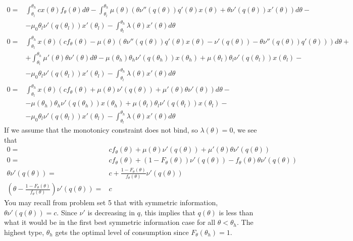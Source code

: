 \documentclass[12pt,reqno]{amsart}
\theoremstyle{definition}
\begin{document}
\begin{align*}
  0 = & \int_{\theta_l}^{\theta_h} c x(\theta) f_\theta(\theta)
  d\theta - \int_{\theta_l}^{\theta_h} \mu(\theta)
  \left( \theta \nu''(q(\theta))q'(\theta) x(\theta) + \theta
    \nu'(q(\theta)) x'(\theta) \right)d\theta - \\
  & - \mu_0 \theta_l
  \nu'(q(\theta_l))x'(\theta_l) - \int_{\theta_l}^{\theta_h}
  \lambda(\theta) x'(\theta) d\theta \\
  0 = & \int_{\theta_l}^{\theta_h} x(\theta)\left( c f_\theta(\theta)
    - \mu(\theta) \left( \theta \nu''(q(\theta))q'(\theta) x(\theta) -
      \nu'(q(\theta)) - \theta \nu''(q(\theta))q'(\theta) \right) \right)
  d\theta + \\
  & + \int_{\theta_l}^{\theta_h} 
  \mu'(\theta) \theta \nu'(\theta) d\theta 
  - \mu(\theta_h)\theta_h \nu'(q(\theta_h))x(\theta_h) +
  \mu(\theta_l)\theta_l \nu'(q(\theta_l))x(\theta_l) - \\
  & - \mu_0 \theta_l \nu'(q(\theta_l))x'(\theta_l) 
  - \int_{\theta_l}^{\theta_h} \lambda(\theta) x'(\theta) d\theta \\
  0 = & \int_{\theta_l}^{\theta_h} x(\theta)\left( c f_\theta(\theta)
    + \mu(\theta) \nu'(q(\theta)) + 
    \mu'(\theta) \theta \nu'(\theta)\right) d\theta  - \\
    & - \mu(\theta_h)\theta_h \nu'(q(\theta_h))x(\theta_h) +
    \mu(\theta_l)\theta_l \nu'(q(\theta_l))x(\theta_l) - \\
    & - \mu_0 \theta_l \nu'(q(\theta_l))x'(\theta_l) 
    - \int_{\theta_l}^{\theta_h} \lambda(\theta) x'(\theta) d\theta 
\end{align*}
If we assume that the monotonicy constraint does not bind, so
$\lambda(\theta) = 0$, we see that
\begin{align*}
  0 = &c f_\theta(\theta) + \mu(\theta) \nu'(q(\theta)) + \mu'(\theta)
   \theta \nu'(q(\theta))  \\
   0 = & cf_\theta(\theta) + (1-F_\theta(\theta)) \nu'(q(\theta)) -
   f_{\theta}(\theta) \theta \nu'(q(\theta)) \\
   \theta \nu'(q(\theta)) = & c +
   \frac{1-F_\theta(\theta)}{f_\theta(\theta)} \nu'(q(\theta)) \\
   \left(\theta - \frac{1-F_\theta(\theta)}{f_\theta(\theta)}
   \right)\nu'(q(\theta)) = & c 
 \end{align*}
You may recall from problem set 5 that with symmetric information,
$\theta \nu'(q(\theta)) = c$. Since $\nu'$ is decreasing in $q$, this
implies that $q(\theta)$ is less than what it would be in the first
best symmetric information case for all $\theta < \theta_h$. The
highest type, $\theta_h$ gets the optimal level of consumption since
$F_\theta(\theta_h) = 1$. 
 
\end{document}
